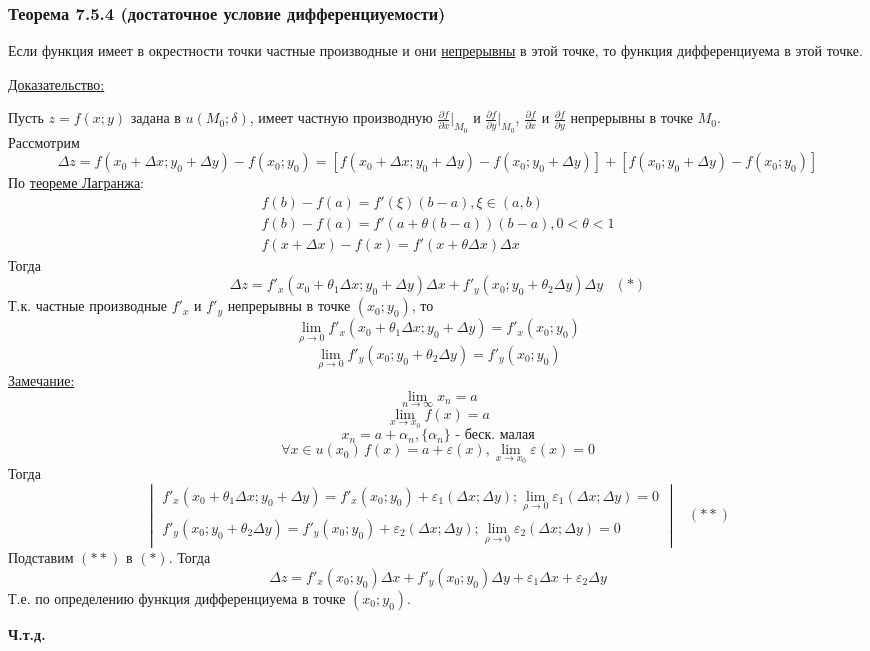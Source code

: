 \documentclass[12pt]{article}
\begin{document}
    \subsubsection*{Теорема 7.5.4 (достаточное условие дифференциуемости)}\label{th:7.5.4}
    Если функция имеет в окрестности точки частные производные и они \underline{непрерывны} в этой точке, то функция дифференциуема в этой точке.\par\noindent
    \underline{Доказательство:}
    \begin{adjustwidth}{1.5em}{1.5em}
        Пусть $z = f(x;y)$ задана в $u(M_0; \delta)$, имеет частную производную $\frac{\partial f}{\partial x} \Big|_{M_0}$ и $\frac{\partial f}{\partial y} \Big|_{M_0}$, $\frac{\partial f}{\partial x}$ и $\frac{\partial f}{\partial y}$ непрерывны в точке $M_0$.\\
        Рассмотрим
        \[ \Delta z = f(x_0 + \Delta x; y_0 + \Delta y) - f(x_0; y_0) = [ f(x_0 + \Delta x; y_0 + \Delta y) - f(x_0; y_0 + \Delta y) ] + [f(x_0; y_0 + \Delta y) - f(x_0; y_0)] \]
        По \hyperref[th:4.12.4]{теореме Лагранжа}:
        \begin{gather*}
            f(b) - f(a) = f'(\xi)(b-a), \xi \in (a, b)\\
            f(b) - f(a) = f'(a + \theta(b-a))(b-a), 0 < \theta < 1\\
            f(x + \Delta x) - f(x) = f'(x + \theta \Delta x) \Delta x
        \end{gather*}
        Тогда
        \[ \Delta z = f'_x (x_0 + \theta_1 \Delta x; y_0 + \Delta y)\Delta x + f'_y(x_0; y_0 + \theta_2 \Delta y)\Delta y\,\,\,\,\, (*) \]
        Т.к. частные производные $f'_x$ и $f'_y$ непрерывны в точке $(x_0; y_0)$, то
        \[ \lim_{\rho \to 0} f'_x(x_0 + \theta_1 \Delta x; y_0 + \Delta y) = f'_x(x_0; y_0) \]
        \[ \lim_{\rho \to 0} f'_y(x_0; y_0 + \theta_2 \Delta y) = f'_y(x_0; y_0) \]
        \underline{Замечание:}
        \[ \lim_{n\to\infty} x_n = a \]
        \[ \lim_{x \to x_0} f(x) = a \]
        \[ x_n = a + \alpha_n, \{ \alpha_n \}\text{ - беск. малая} \]
        \[ \forall x \in u(x_0)\, f(x) = a + \varepsilon(x), \lim_{x\to x_0} \varepsilon(x) = 0 \]
        Тогда
        \[ \begin{vmatrix}
            f'_x(x_0 + \theta_1 \Delta x; y_0 + \Delta y) = f'_x (x_0; y_0) + \varepsilon_1 (\Delta x; \Delta y); \lim_{\rho \to 0} \varepsilon_1(\Delta x; \Delta y) = 0\\
            f'_y(x_0; y_0 + \theta_2 \Delta y) = f'_y (x_0; y_0) + \varepsilon_2 (\Delta x; \Delta y); \lim_{\rho \to 0} \varepsilon_2(\Delta x; \Delta y) = 0
        \end{vmatrix} \,\,\,\,\, (**) \]
        Подставим $(**)$ в $(*)$. Тогда
        \[ \Delta z = f'_x(x_0; y_0)\Delta x + f'_y(x_0; y_0)\Delta y + \varepsilon_1\Delta x + \varepsilon_2 \Delta y \]
        Т.е. по определению функция дифференциуема в точке $(x_0; y_0)$.
        \begin{center}
            \textbf{Ч.т.д.}
        \end{center}
    \end{adjustwidth}
\end{document}
